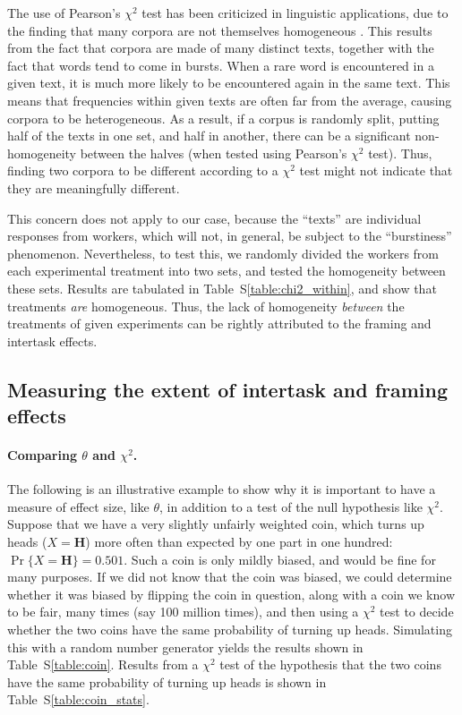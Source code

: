 \documentclass[12pt]{article}
\begin{document}
The use of Pearson's $\chi^2$ test has been criticized in linguistic 
applications, due to the finding that many corpora are not themselves
homogeneous \cite{kilgarriff1996comparing}.  
This results from the fact that corpora are made of many
distinct texts, together with the fact that words tend to come in bursts.
When a rare word is encountered in a given text, it is much more likely
to be encountered again in the same text. This means that
frequencies within given texts are often far from the average, causing 
corpora to be heterogeneous.
As a result, if a corpus is randomly split, putting half of the texts in one 
set, and half in another, there can be a significant non-homogeneity between 
the halves (when tested using Pearson's $\chi^2$ test).  Thus, finding two
corpora to be different according to a $\chi^2$ test might not 
indicate that they are meaningfully different.

This concern does not apply to our case, because the ``texts'' are 
individual responses from workers, which will not, in general, be subject to 
the ``burstiness'' phenomenon.  Nevertheless, to test this, we randomly 
divided the workers from each experimental treatment into two sets, and 
tested the homogeneity 
between these sets.  Results are tabulated in Table~S\ref{table:chi2_within}, 
and show that treatments 
\textit{are} homogeneous.  Thus, the lack of homogeneity \textit{between} 
the treatments of given experiments can be rightly attributed to the 
framing and intertask effects.

\subsection*{Measuring the extent of intertask and framing effects}

\paragraph{Comparing $\theta$ and $\chi^2$.}
The following is an illustrative example to show why it is important to 
have a measure of effect size, like $\theta$, in addition to a test of the 
null hypothesis like $\chi^2$.
Suppose that we have a very slightly unfairly weighted coin, which turns
up heads ($X=\mathbf{H}$) more often than expected by one part in one hundred:
$\Pr\{X=\mathbf{H}\} = 0.501$. Such a coin is only mildly biased, and would 
be fine for many purposes.  If we did not know that the coin was
biased, we could determine whether it was biased by flipping the coin in 
question, along with a coin we know to be fair, many times 
(say 100 million times), and then using a $\chi^2$ test to decide whether 
the two coins have the same probability of turning up heads.
Simulating this with a random number generator yields the results shown
in Table~S\ref{table:coin}.  Results from a $\chi^2$ test of the
hypothesis that the two coins have the same probability of turning up heads 
is shown in Table~S\ref{table:coin_stats}.
\end{document}
